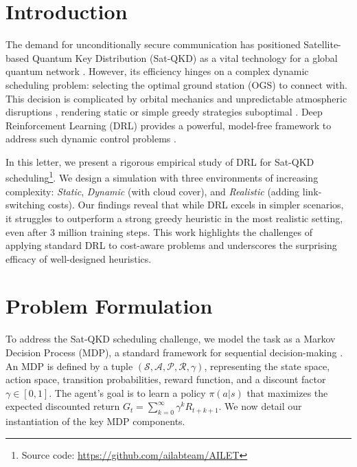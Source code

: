 \documentclass[manuscript, review, nonacm]{acmart}
\begin{document}
\section{Introduction}\label{sec:introduction}
The demand for unconditionally secure communication has positioned Satellite-based Quantum Key Distribution (Sat-QKD) as a vital technology for a global quantum network \cite{gisin2002quantum, liao2017satellite}. However, its efficiency hinges on a complex dynamic scheduling problem: selecting the optimal ground station (OGS) to connect with. This decision is complicated by orbital mechanics \cite{deniz2021routing} and unpredictable atmospheric disruptions \cite{bourgoin2013comprehensive}, rendering static or simple greedy strategies suboptimal \cite{oi2021optimization}. Deep Reinforcement Learning (DRL) provides a powerful, model-free framework to address such dynamic control problems \cite{sutton2018reinforcement}.

In this letter, we present a rigorous empirical study of DRL for Sat-QKD scheduling\footnote{Source code: \url{https://github.com/ailabteam/AILET}}. We design a simulation with three environments of increasing complexity: \textit{Static}, \textit{Dynamic} (with cloud cover), and \textit{Realistic} (adding link-switching costs). Our findings reveal that while DRL excels in simpler scenarios, it struggles to outperform a strong greedy heuristic in the most realistic setting, even after 3 million training steps. This work highlights the challenges of applying standard DRL to cost-aware problems and underscores the surprising efficacy of well-designed heuristics.

\section{Problem Formulation}\label{sec:formulation}

To address the Sat-QKD scheduling challenge, we model the task as a Markov Decision Process (MDP), a standard framework for sequential decision-making \cite{sutton2018reinforcement}. An MDP is defined by a tuple $(\mathcal{S}, \mathcal{A}, \mathcal{P}, \mathcal{R}, \gamma)$, representing the state space, action space, transition probabilities, reward function, and a discount factor $\gamma \in [0, 1]$. The agent's goal is to learn a policy $\pi(a|s)$ that maximizes the expected discounted return $G_t = \sum_{k=0}^{\infty} \gamma^k R_{t+k+1}$. We now detail our instantiation of the key MDP components.
\end{document}
